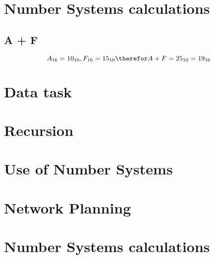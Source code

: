 \documentclass{article}
\begin{document}
\section{Number Systems calculations}
\subsection{A + F}
\[
	A_{16} = 10_{10}, F_{16} = 15_{10} \therefor A+F = 25_{10} = 19_{16}
\]
\section{Data task}

\section{Recursion}

\section{Use of Number Systems}

\section{Network Planning}

\section{Number Systems calculations}
\end{document}
